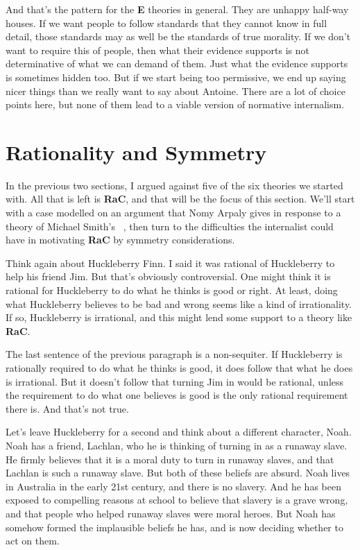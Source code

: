 And that's the pattern for the \textbf{E} theories in general. They are unhappy half-way houses. If we want people to follow standards that they cannot know in full detail, those standards may as well be the standards of true morality. If we don't want to require this of people, then what their evidence supports is not determinative of what we can demand of them. Just what the evidence supports is sometimes hidden too. But if we start being too permissive, we end up saying nicer things than we really want to say about \gls{Antoine}. There are a lot of choice points here, but none of them lead to a viable version of normative internalism.

\section{Rationality and Symmetry}
\label{rationalityandsymmetry}

In the previous two sections, I argued against five of the six theories we started with. All that is left is \textbf{RaC}, and that will be the focus of this section. We'll start with a case modelled on an argument that Nomy Arpaly gives in response to a theory of Michael Smith's ~\citep[36-46]{Arpaly2003}, then turn to the difficulties the internalist could have in motivating \textbf{RaC} by symmetry considerations.

Think again about \gls{Huck}leberry Finn. I said it was rational of \gls{Huck}leberry to help his friend Jim. But that's obviously controversial. One might think it is rational for \gls{Huck}leberry to do what he thinks is good or right. At least, doing what \gls{Huck}leberry believes to be bad and wrong seems like a kind of irrationality. If so, \gls{Huck}leberry is irrational, and this might lend some support to a theory like \textbf{RaC}.

The last sentence of the previous paragraph is a non-sequiter. If \gls{Huck}leberry is rationally required to do what he thinks is good, it does follow that what he does is irrational. But it doesn't follow that turning Jim in would be rational, unless the requirement to do what one believes is good is the only rational requirement there is. And that's not true.

Let's leave \gls{Huck}leberry for a second and think about a different character, \gls{Noah}. \gls{Noah} has a friend, \gls{Lachlan}, who he is thinking of turning in as a runaway slave. He firmly believes that it is a moral duty to turn in runaway slaves, and that \gls{Lachlan} is such a runaway slave. But both of these beliefs are absurd. \gls{Noah} lives in Australia in the early 21st century, and there is no slavery. And he has been exposed to compelling reasons at school to believe that slavery is a grave wrong, and that people who helped runaway slaves were moral heroes. But \gls{Noah} has somehow formed the implausible beliefs he has, and is now deciding whether to act on them.

